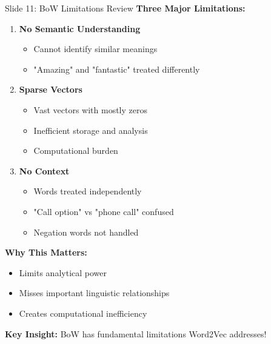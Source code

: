 \documentclass[8pt]{beamer}
\begin{document}
	\begin{frame}{Slide 11: BoW Limitations Review}
		\fontsize{6.5}{7.5}\selectfont
		\textbf{Three Major Limitations:}
		\begin{enumerate}
			\item \textbf{No Semantic Understanding}
			\begin{itemize}
				\item Cannot identify similar meanings
				\item "Amazing" and "fantastic" treated differently
			\end{itemize}
			\item \textbf{Sparse Vectors}
			\begin{itemize}
				\item Vast vectors with mostly zeros
				\item Inefficient storage and analysis
				\item Computational burden
			\end{itemize}
			\item \textbf{No Context}
			\begin{itemize}
				\item Words treated independently
				\item "Call option" vs "phone call" confused
				\item Negation words not handled
			\end{itemize}
		\end{enumerate}
		
		\vspace{0.1cm}
		\textbf{Why This Matters:}
		\begin{itemize}
			\item Limits analytical power
			\item Misses important linguistic relationships
			\item Creates computational inefficiency
		\end{itemize}
		
		\textcolor{myblue}{\textbf{Key Insight:}} BoW has fundamental limitations Word2Vec addresses!
	\end{frame}
	
\end{document}
